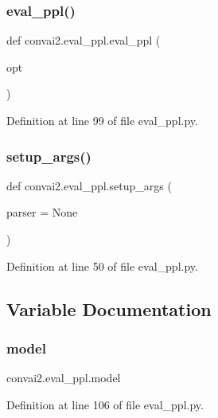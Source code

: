 \subsubsection{\texorpdfstring{eval\+\_\+ppl()}{eval\_ppl()}}
{\footnotesize\ttfamily def convai2.\+eval\+\_\+ppl.\+eval\+\_\+ppl (\begin{DoxyParamCaption}\item[{}]{opt }\end{DoxyParamCaption})}



Definition at line 99 of file eval\+\_\+ppl.\+py.

\mbox{\label{namespaceconvai2_1_1eval__ppl_a7c5c67a76df91f064ac903d243682416}} 
\subsubsection{\texorpdfstring{setup\+\_\+args()}{setup\_args()}}
{\footnotesize\ttfamily def convai2.\+eval\+\_\+ppl.\+setup\+\_\+args (\begin{DoxyParamCaption}\item[{}]{parser = {\ttfamily None} }\end{DoxyParamCaption})}



Definition at line 50 of file eval\+\_\+ppl.\+py.



\subsection{Variable Documentation}
\mbox{\label{namespaceconvai2_1_1eval__ppl_ab0bd8644f41db5ba43b043cf2e1a0d4d}} 
\subsubsection{\texorpdfstring{model}{model}}
{\footnotesize\ttfamily convai2.\+eval\+\_\+ppl.\+model}



Definition at line 106 of file eval\+\_\+ppl.\+py.

